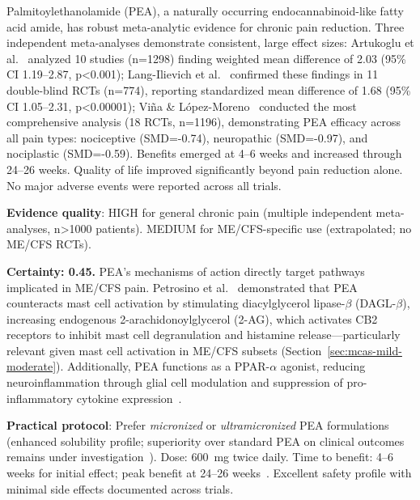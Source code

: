 \begin{observation}
\label{obs:pea-chronic-pain-meta}
Palmitoylethanolamide (PEA), a naturally occurring endocannabinoid-like fatty acid amide, has robust meta-analytic evidence for chronic pain reduction. Three independent meta-analyses demonstrate consistent, large effect sizes: Artukoglu et al.~\cite{Artukoglu2017pea} analyzed 10 studies (n=1298) finding weighted mean difference of 2.03 (95\% CI 1.19--2.87, p<0.001); Lang-Ilievich et al.~\cite{LangIlievich2023pea} confirmed these findings in 11 double-blind RCTs (n=774), reporting standardized mean difference of 1.68 (95\% CI 1.05--2.31, p<0.00001); Vi\~na \& López-Moreno~\cite{Vina2025pea} conducted the most comprehensive analysis (18 RCTs, n=1196), demonstrating PEA efficacy across all pain types: nociceptive (SMD=-0.74), neuropathic (SMD=-0.97), and nociplastic (SMD=-0.59). Benefits emerged at 4--6 weeks and increased through 24--26 weeks. Quality of life improved significantly beyond pain reduction alone. No major adverse events were reported across all trials.

\textbf{Evidence quality}: HIGH for general chronic pain (multiple independent meta-analyses, n>1000 patients). MEDIUM for ME/CFS-specific use (extrapolated; no ME/CFS RCTs).
\end{observation}

\begin{hypothesis}
\label{hyp:pea-mecfs-pain-mechanisms}
\textbf{Certainty: 0.45.} PEA's mechanisms of action directly target pathways implicated in ME/CFS pain. Petrosino et al.~\cite{Petrosino2019pea} demonstrated that PEA counteracts mast cell activation by stimulating diacylglycerol lipase-$\beta$ (DAGL-$\beta$), increasing endogenous 2-arachidonoylglycerol (2-AG), which activates CB2 receptors to inhibit mast cell degranulation and histamine release---particularly relevant given mast cell activation in ME/CFS subsets (Section~\ref{sec:mcas-mild-moderate}). Additionally, PEA functions as a PPAR-$\alpha$ agonist, reducing neuroinflammation through glial cell modulation and suppression of pro-inflammatory cytokine expression~\cite{Varrassi2025pea}.
\end{hypothesis}

\textbf{Practical protocol}: Prefer \emph{micronized} or \emph{ultramicronized} PEA formulations (enhanced solubility profile; superiority over standard PEA on clinical outcomes remains under investigation~\cite{LangIllievich2023PEA}). Dose: 600~mg twice daily. Time to benefit: 4--6 weeks for initial effect; peak benefit at 24--26 weeks~\cite{LangIllievich2023PEA}. Excellent safety profile with minimal side effects documented across trials.

